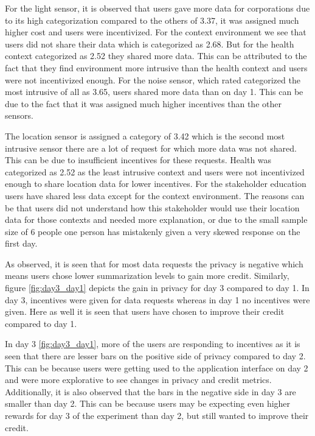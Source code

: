 For the light sensor, it is observed that users gave more data for corporations due to its high categorization compared to the others of 3.37, it was assigned much higher cost and users were incentivized. For the context environment we see that users did not share their data which is categorized as 2.68. But for the health context categorized as 2.52 they shared more data. This can be attributed to the fact that they find environment more intrusive than the health context and users were not incentivized enough. For the noise sensor, which rated categorized the most intrusive of all as 3.65, users shared more data than on day 1. This can be due to the fact that it was assigned much higher incentives than the other sensors.

The location sensor is assigned a category of 3.42 which is the second most intrusive sensor there are a lot of request for which more data was not shared. This can be due to insufficient incentives for these requests. Health was categorized as 2.52 as the least intrusive context and users were not incentivized enough to share location data for lower incentives. For the stakeholder education users have shared less data except for the context environment. The reasons can be that users did not understand how this stakeholder would use their location data for those contexts and needed more explanation, or due to the small sample size of 6 people one person has mistakenly given a very skewed response on the first day.

As observed, it is seen that for most data requests the privacy is negative which means users chose lower summarization levels to gain more credit. Similarly, figure \ref{fig:day3_day1} depicts the gain in privacy for day 3 compared to day 1. In day 3, incentives were given for data requests whereas in day 1 no incentives were given. Here as well it is seen that users have chosen to improve their credit compared to day 1. 

In day 3 \ref{fig:day3_day1}, more of the users are responding to incentives as it is seen that there are lesser bars on the positive side of privacy compared to day 2. This can be because users were getting used to the application interface on day 2 and were more explorative to see changes in privacy and credit metrics. Additionally, it is also observed that the bars in the negative side in day 3 are smaller than day 2. This can be because users may be expecting even higher rewards for day 3 of the experiment than day 2, but still wanted to improve their credit.

